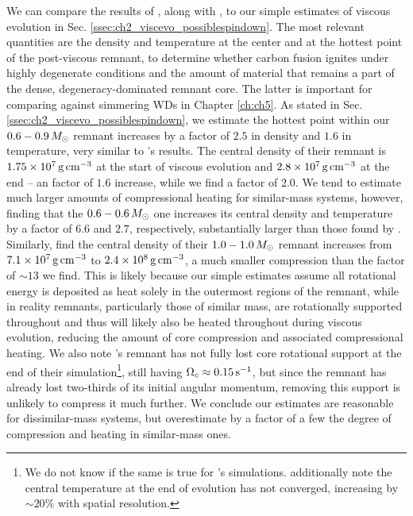 
We can compare the results of \cite{ji+13}, along with \cite{schw+12}, to our simple estimates of viscous evolution in Sec. \ref{ssec:ch2_viscevo_possiblespindown}.  The most relevant quantities are the density and temperature at the center and at the hottest point of the post-viscous remnant, to determine whether carbon fusion ignites under highly degenerate conditions and the amount of material that remains a part of the dense, degeneracy-dominated remnant core.  The latter is important for comparing against simmering WDs in Chapter \ref{ch:ch5}.  As stated in Sec. \ref{ssec:ch2_viscevo_possiblespindown}, we estimate the hottest point within our $0.6-0.9\,\Msun$ remnant increases by a factor of $2.5$ in density and $1.6$ in temperature, very similar to \cite{schw+12}'s results.  The central density of their remnant is $1.75\times10^7\,\gcc$ at the start of viscous evolution \citep{dan+11} and $2.8\times10^7\,\gcc$ at the end -- an factor of $1.6$ increase, while we find a factor of $2.0$.  We tend to estimate much larger amounts of compressional heating for similar-mass systems, however, finding that the $0.6 - 0.6\,\Msun$ one increases its central density and temperature by a factor of $6.6$ and $2.7$, respectively, substantially larger than those found by \cite{ji+13}.  Similarly, \cite{rask+14} find the central density of their $1.0-1.0\,\Msun$ remnant increases from $7.1\times10^7\,\gcc$ to $2.4\times10^8\,\gcc$, a much smaller compression than the factor of $\sim13$ we find.  This is likely because our simple estimates assume all rotational energy is deposited as heat solely in the outermost regions of the remnant, while in reality remnants, particularly those of similar mass, are rotationally supported throughout and thus will likely also be heated throughout during viscous evolution, reducing the amount of core compression and associated compressional heating.  We also note \cite{ji+13}'s remnant has not fully lost core rotational support at the end of their simulation\footnote{We do not know if the same is true for \cite{rask+14}'s simulations.  \cite{ji+13} additionally note the central temperature at the end of evolution has not converged, increasing by $\sim20$\% with spatial resolution.}, still having $\Omegac \approx 0.15\,\psec$, {\charles but since the remnant has already lost two-thirds of its initial angular momentum, removing this support is unlikely to compress it much further.}  We conclude our estimates are reasonable for dissimilar-mass systems, but overestimate by a factor of a few the degree of compression and heating in similar-mass ones.

